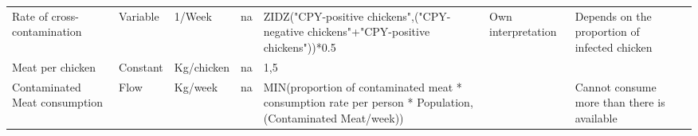 \begin{landscape}
\begin{longtable}[c]{m{10em}lllm{15em}lll}
Rate of cross-contamination                   & Variable & 1/Week                   & na                        & ZIDZ("CPY-positive chickens",("CPY-negative chickens"+"CPY-positive chickens"))*0.5                                                                                                                                                                                                      & Own interpretation                                                                                                                                                                           & Depends on the proportion of infected chicken                                                                                                                                                                                         \\
Meat per chicken                              & Constant & Kg/chicken               & na                        & 1,5                                                                                                                                                                                                                                                                                      &                                                                                                                                                                                              &                                                                                                                                                                                                                                       \\
Contaminated Meat consumption                 & Flow     & Kg/week                  & na                        & MIN(proportion of contaminated meat * consumption rate per person * Population, (Contaminated Meat/week))                                                                                                                                                                                &                                                                                                                                                                                              & Cannot consume more than there is available                                                                                                                                                                                           \\

\end{longtable}
\end{landscape}
